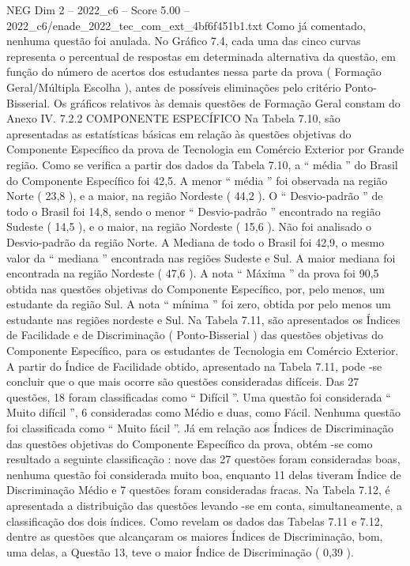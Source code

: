 \begin{textsample}{NEG Dim 2 – 2022\_c6 – Score 5.00 – 2022\_c6/enade\_2022\_tec\_com\_ext\_4bf6f451b1.txt}
Como já comentado, nenhuma questão foi anulada.
No Gráfico 7.4, cada uma das cinco curvas representa o percentual de respostas em determinada alternativa da questão, em função do número de acertos dos estudantes nessa parte da prova ( Formação Geral/Múltipla Escolha ), antes de possíveis eliminações pelo critério Ponto-Bisserial.
Os gráficos relativos às demais questões de Formação Geral constam do Anexo IV. 7.2.2 COMPONENTE ESPECÍFICO Na Tabela 7.10, são apresentadas as estatísticas básicas em relação às questões objetivas do Componente Específico da prova de Tecnologia em Comércio Exterior por Grande região.
Como se verifica a partir dos dados da Tabela 7.10, a “ média ” do Brasil do Componente Específico foi 42,5.
A menor “ média ” foi observada na região Norte ( 23,8 ), e a maior, na região Nordeste ( 44,2 ).
O “ Desvio-padrão ” de todo o Brasil foi 14,8, sendo o menor “ Desvio-padrão ” encontrado na região Sudeste ( 14,5 ), e o maior, na região Nordeste ( 15,6 ).
Não foi analisado o Desvio-padrão da região Norte.
A Mediana de todo o Brasil foi 42,9, o mesmo valor da “ mediana ” encontrada nas regiões Sudeste e Sul.
A maior mediana foi encontrada na região Nordeste ( 47,6 ).
A nota “ Máxima ” da prova foi 90,5 obtida nas questões objetivas do Componente Específico, por, pelo menos, um estudante da região Sul.
A nota “ mínima ” foi zero, obtida por pelo menos um estudante nas regiões nordeste e Sul.
Na Tabela 7.11, são apresentados os Índices de Facilidade e de Discriminação ( Ponto-Bisserial ) das questões objetivas do Componente Específico, para os estudantes de Tecnologia em Comércio Exterior.
A partir do Índice de Facilidade obtido, apresentado na Tabela 7.11, pode -se concluir que o que mais ocorre são questões consideradas difíceis.
Das 27 questões, 18 foram classificadas como “ Difícil ”.
Uma questão foi considerada “ Muito difícil ”, 6 consideradas como Médio e duas, como Fácil.
Nenhuma questão foi classificada como “ Muito fácil ”.
Já em relação aos Índices de Discriminação das questões objetivas do Componente Específico da prova, obtém -se como resultado a seguinte classificação : nove das 27 questões foram consideradas boas, nenhuma questão foi considerada muito boa, enquanto 11 delas tiveram Índice de Discriminação Médio e 7 questões foram consideradas fracas.
Na Tabela 7.12, é apresentada a distribuição das questões levando -se em conta, simultaneamente, a classificação dos dois índices.
Como revelam os dados das Tabelas 7.11 e 7.12, dentre as questões que alcançaram os maiores Índices de Discriminação, bom, uma delas, a Questão 13, teve o maior Índice de Discriminação ( 0,39 ).

\end{textsample}
